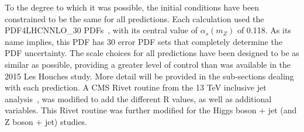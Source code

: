 \documentclass[aps,prd,onecolumn,fleqn,superscriptaddress,groupedaddress,nofootinbib,preprintnumbers,nobalancelastpage]{revtex4}
\begin{document}
To the degree to which it was possible, the initial conditions have been
constrained to be the same for all predictions. Each calculation used the
PDF4LHCNNLO\_30 PDFs~\cite{Butterworth:2015oua}, with its central value of
$\alpha_s(m_Z)$ of 0.118. As its name implies, this PDF has 30 error PDF sets
that completely determine the PDF uncertainty. The scale choices for all
predictions have been designed to be as similar as possible, 
providing a greater level of control than was available in the 2015 Les Houches
study. More detail will be
provided in the sub-sections dealing with each prediction. 
A CMS Rivet routine from the 13 TeV  inclusive jet analysis~\cite{Khachatryan:2016wdh}, was
modified to add the different R values, as well as additional variables. This
Rivet routine was further modified for the Higgs boson + jet (and Z boson + jet)
studies. 
\end{document}
